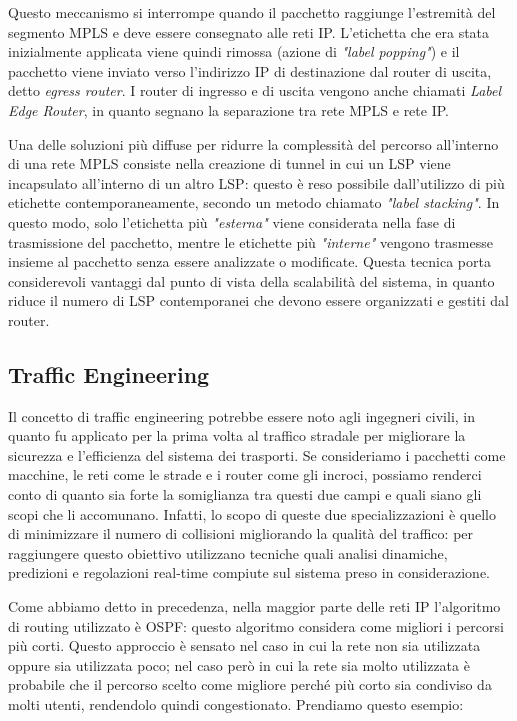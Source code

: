 \documentclass[10pt,a4paper]{report}
\begin{document}
Questo meccanismo si interrompe quando il pacchetto raggiunge
l'estremità del segmento MPLS e deve essere consegnato alle reti
IP. L'etichetta che era stata inizialmente applicata viene quindi
rimossa (azione di \textit{"label popping"}) e il pacchetto viene
inviato verso l'indirizzo IP di destinazione dal router di uscita,
detto \textit{egress router}. I router di ingresso e di uscita vengono
anche chiamati \textit{Label Edge Router}, in quanto segnano la
separazione tra rete MPLS e rete IP.

Una delle soluzioni più diffuse per ridurre la complessità del
percorso all'interno di una rete MPLS consiste nella creazione di
tunnel in cui un LSP viene incapsulato all'interno di un altro LSP:
questo è reso possibile dall'utilizzo di più etichette
contemporaneamente, secondo un metodo chiamato \textit{"label
  stacking"}. In questo modo, solo l'etichetta più \textit{"esterna"}
viene considerata nella fase di trasmissione del pacchetto, mentre le
etichette più \textit{"interne"} vengono trasmesse insieme al
pacchetto senza essere analizzate o modificate. Questa tecnica porta
considerevoli vantaggi dal punto di vista della scalabilità del
sistema, in quanto riduce il numero di LSP contemporanei che devono
essere organizzati e gestiti dal router.

\subsection*{Traffic Engineering}

Il concetto di traffic engineering potrebbe essere noto agli ingegneri
civili, in quanto fu applicato per la prima volta al traffico stradale
per migliorare la sicurezza e l'efficienza del sistema dei
trasporti. Se consideriamo i pacchetti come macchine, le reti come le
strade e i router come gli incroci, possiamo renderci conto di quanto
sia forte la somiglianza tra questi due campi e quali siano gli scopi
che li accomunano. Infatti, lo scopo di queste due specializzazioni è
quello di minimizzare il numero di collisioni migliorando la qualità
del traffico: per raggiungere questo obiettivo utilizzano tecniche
quali analisi dinamiche, predizioni e regolazioni real-time compiute
sul sistema preso in considerazione.

Come abbiamo detto in precedenza, nella maggior parte delle reti IP
l'algoritmo di routing utilizzato è OSPF: questo algoritmo considera
come migliori i percorsi più corti. Questo approccio è sensato nel
caso in cui la rete non sia utilizzata oppure sia utilizzata poco; nel
caso però in cui la rete sia molto utilizzata è probabile che il
percorso scelto come migliore perché più corto sia condiviso da molti
utenti, rendendolo quindi congestionato. Prendiamo questo esempio:
\end{document}
